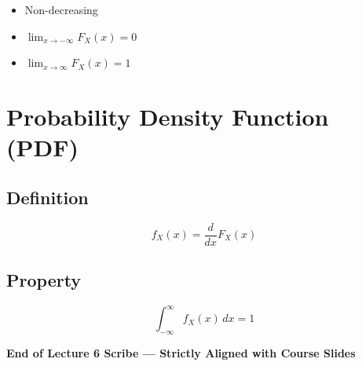 \documentclass[11pt]{article}
\begin{document}
\begin{itemize}
    \item Non-decreasing
    \item $\lim_{x\to -\infty} F_X(x)=0$
    \item $\lim_{x\to \infty} F_X(x)=1$
\end{itemize}

\section{Probability Density Function (PDF)}

\subsection{Definition}

\[
f_X(x) = \frac{d}{dx} F_X(x)
\]

\subsection{Property}

\[
\int_{-\infty}^{\infty} f_X(x)\,dx = 1
\]

\vfill
\begin{center}
\textbf{End of Lecture 6 Scribe — Strictly Aligned with Course Slides}
\end{center}
\end{document}
